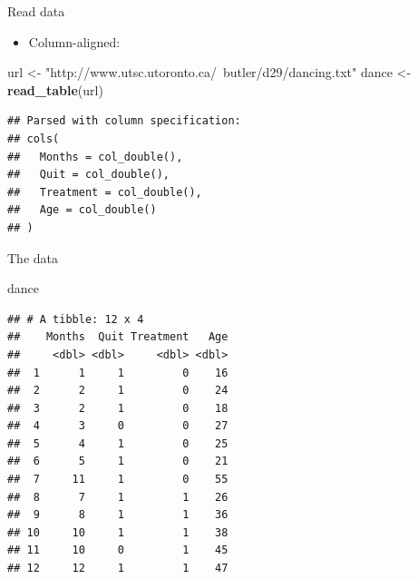 \documentclass[
  ignorenonframetext,
]{beamer}
\newenvironment{Shaded}{\begin{snugshade}}{\end{snugshade}}
\newcommand{\KeywordTok}[1]{\textcolor[rgb]{0.13,0.29,0.53}{\textbf{#1}}}
\newcommand{\NormalTok}[1]{#1}
\newcommand{\StringTok}[1]{\textcolor[rgb]{0.31,0.60,0.02}{#1}}
\providecommand{\tightlist}{%
  \setlength{\itemsep}{0pt}\setlength{\parskip}{0pt}}
\begin{document}
\begin{frame}[fragile]{Read data}
\protect\hypertarget{read-data}{}

\begin{itemize}
\tightlist
\item
  Column-aligned:
\end{itemize}

\normalsize

\begin{Shaded}
\begin{Highlighting}[]
\NormalTok{url <-}\StringTok{ "http://www.utsc.utoronto.ca/~butler/d29/dancing.txt"}
\NormalTok{dance <-}\StringTok{ }\KeywordTok{read_table}\NormalTok{(url)}
\end{Highlighting}
\end{Shaded}

\begin{verbatim}
## Parsed with column specification:
## cols(
##   Months = col_double(),
##   Quit = col_double(),
##   Treatment = col_double(),
##   Age = col_double()
## )
\end{verbatim}

\normalsize

\end{frame}

\begin{frame}[fragile]{The data}
\protect\hypertarget{the-data-5}{}

\small

\begin{Shaded}
\begin{Highlighting}[]
\NormalTok{dance}
\end{Highlighting}
\end{Shaded}

\begin{verbatim}
## # A tibble: 12 x 4
##    Months  Quit Treatment   Age
##     <dbl> <dbl>     <dbl> <dbl>
##  1      1     1         0    16
##  2      2     1         0    24
##  3      2     1         0    18
##  4      3     0         0    27
##  5      4     1         0    25
##  6      5     1         0    21
##  7     11     1         0    55
##  8      7     1         1    26
##  9      8     1         1    36
## 10     10     1         1    38
## 11     10     0         1    45
## 12     12     1         1    47
\end{verbatim}

\normalsize

\end{frame}
\end{document}
